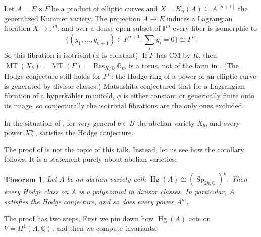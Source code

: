 \documentclass[12pt]{amsart}
\newcommand{\Q}{\mathbb{Q}}
\newcommand{\PP}{\mathbb{P}}
\newcommand{\Gm}{\mathbb{G}_m}
\DeclareMathOperator{\Sp}{Sp}
\DeclareMathOperator{\MT}{MT}
\DeclareMathOperator{\Hg}{Hg}
\DeclareMathOperator{\Res}{Res}
\newtheorem{theorem}{Theorem}[section]
\theoremstyle{definition}
\theoremstyle{remark}
\numberwithin{equation}{section}
\begin{document}
\begin{remark}
    Let $A = E \times F$ be a product of elliptic curves and
    $X = K_n(A) \subseteq A^{[n+1]}$ the generalized Kummer variety. The
    projection $A \to E$ induces a Lagrangian fibration $X \to \PP^n$, and
    over a dense open subset of $\PP^n$ every fiber is isomorphic to
    \begin{equation*}
        \Big\{(y_1, \ldots, y_{n+1}) \in F^{n+1} : \sum_i y_i = 0\Big\}
        \cong F^n.
    \end{equation*}
    So this fibration is isotrivial ($\phi$ is constant). If $F$ has CM by $K$,
    then $\MT(X_b) = \MT(F) = \Res_{K/\Q}\Gm$ is a torus, not of the form in
    . (The Hodge conjecture still holds for $F^n$: the Hodge
    ring of a power of an elliptic curve is generated by divisor classes.)
    Matsushita conjectured that for a Lagrangian fibration of a hyperk\"ahler
    manifold, $\phi$ is either constant or generically finite onto its image,
    so conjecturally the isotrivial fibrations are the only ones excluded.
\end{remark}

\begin{corollary}\label{cor:main}
    In the situation of , for very general $b \in B$ the
    abelian variety $X_b$, and every power $X_b^m$, satisfies the Hodge
    conjecture.
\end{corollary}

The proof of  is not the topic of this talk. Instead, let us
see how the corollary follows. It is a statement purely about abelian
varieties:

\begin{theorem}\label{thm:HC-from-MT}
    Let $A$ be an abelian variety with $\Hg(A) \cong (\Sp_{2h, \Q})^k$. Then
    every Hodge class on $A$ is a polynomial in divisor classes. In
    particular, $A$ satisfies the Hodge conjecture, and so does every power
    $A^m$.
\end{theorem}

The proof has two steps. First we pin down how $\Hg(A)$ acts on
$V = H^1(A, \Q)$, and then we compute invariants.
\end{document}
